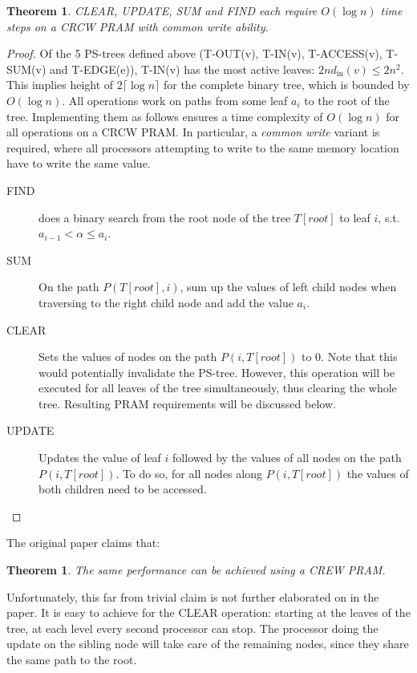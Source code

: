 \documentclass[a4paper,10pt, twocolumn]{article}
\newtheorem{theorem}[lemma]{Theorem}
\begin{document}
\begin{theorem}
CLEAR, UPDATE, SUM and FIND each require $O(\log n)$ time steps on a CRCW PRAM with common write ability\cite{yossi81}.
\end{theorem}
\begin{proof}
Of the 5 PS-trees defined above (T-OUT(v), T-IN(v), T-ACCESS(v), T-SUM(v) and T-EDGE(e)), T-IN(v) has the most active leaves: $2nd_{\mathrm{in}}(v) \leq 2n^2$. This implies height of $2 \lceil \log n \rceil$ for the complete binary tree, which is bounded by $O(\log n)$. All operations work on paths from some leaf $a_i$ to the root of the tree. Implementing them as follows ensures a time complexity of $O(\log n)$ for all operations on a CRCW PRAM. In particular, a \emph{common write} variant is required, where all processors attempting to write to the same memory location have to write the same value.
\begin{description}
	\item [FIND] does a binary search from the root node of the tree $T[root]$ to leaf $i$, s.t. $a_{i-1} < \alpha \leq a_i$. 
	\item [SUM] On the path $P(T[root], i)$, sum up the values of left child nodes when traversing to the right child node and add the value $a_i$.
	\item [CLEAR] Sets the values of nodes on the path $P(i, T[root])$ to 0. Note that this would potentially invalidate the PS-tree. However, this operation will be executed for all leaves of the tree simultaneously, thus clearing the whole tree. Resulting PRAM requirements will be discussed below.
	\item [UPDATE] Updates the value of leaf $i$ followed by the values of all nodes on the path $P(i, T[root])$. To do so, for all nodes along $P(i, T[root])$ the values of both children need to be accessed.
\end{description}
\end{proof}

The original paper\cite{yossi81} claims that:
\begin{theorem}
The same performance can be achieved using a CREW PRAM.
\end{theorem}

Unfortunately, this far from trivial claim is not further elaborated on in the paper. It is easy to achieve for the CLEAR operation: starting at the leaves of the tree, at each level every second processor can stop. The processor doing the update on the sibling node will take care of the remaining nodes, since they share the same path to the root. 
\end{document}
